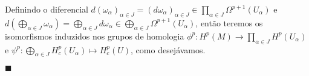 \documentclass{article}
\newcommand{\cohomologia}[2]{H^{#1}(#2)}
\newcommand{\cohomologiacompac}[2]{H^{#1}_{c}(#2)}
\begin{document}
	Definindo o diferencial $d(\omega_{\alpha})_{\alpha \in J} = (d\omega_{\alpha})_{\alpha \in J} \in \prod_{\alpha \in J}\Omega^{p+1}(U_{\alpha})$ e $d(\bigoplus_{\alpha \in J} \omega_{\alpha}) = \bigoplus_{\alpha \in J}d\omega_{\alpha} \in \bigoplus_{\alpha \in J}\Omega^{p+1}(U_{\alpha})$, então teremos os isomorfismos induzidos nos grupos de homologia $\phi^{p}:\cohomologia{p}{M} \to \prod_{\alpha \in J} \cohomologia{p}{U_{\alpha}}$ e $\psi^{p}: \bigoplus_{\alpha \in J} \cohomologiacompac{p}{U_{\alpha}} \mapsto \cohomologiacompac{p}{U}$, como desejávamos.
	
	$\blacksquare$
\end{document}
